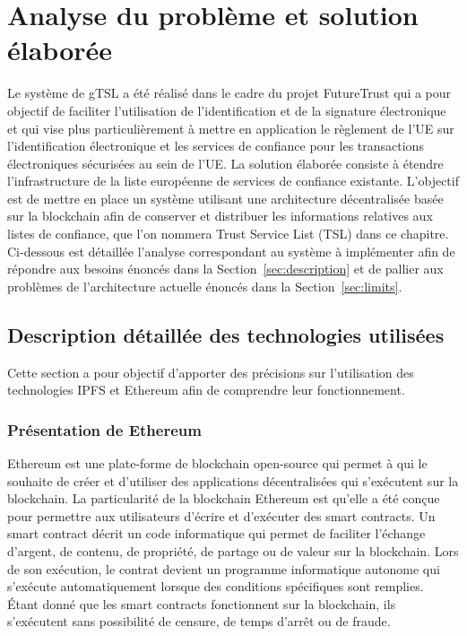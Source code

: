 \documentclass{tnreport}
\begin{document}
\chapter{Analyse du problème et solution élaborée}
\label{sec:analyse}

Le système de gTSL a été réalisé dans le cadre du projet FutureTrust qui a pour objectif de faciliter l'utilisation de l'identification et de la signature électronique et qui vise plus particulièrement à mettre en application le règlement de l'UE sur l'identification électronique et les services de confiance pour les transactions électroniques sécurisées au sein de l'UE.
La solution élaborée consiste à étendre l'infrastructure de la liste européenne de services de confiance existante. L'objectif est de mettre en place un système utilisant une architecture décentralisée basée sur la blockchain afin de conserver et distribuer les informations relatives aux listes de confiance, que l'on nommera Trust Service List (TSL) dans ce chapitre. Ci-dessous est détaillée l'analyse correspondant au système à implémenter afin de répondre aux besoins énoncés dans la Section~\ref{sec:description} et de pallier aux problèmes de l'architecture actuelle énoncés dans la Section~\ref{sec:limits}.

\section{Description détaillée des technologies utilisées}

Cette section a pour objectif d'apporter des précisions sur l'utilisation des technologies IPFS et Ethereum afin de comprendre leur fonctionnement.

\subsection{Présentation de Ethereum}

Ethereum est une plate-forme de blockchain open-source qui permet à qui le souhaite de créer et d'utiliser des applications décentralisées qui s'exécutent sur la blockchain. 
La particularité de la blockchain Ethereum est qu'elle a été conçue pour permettre aux utilisateurs d'écrire et d'exécuter des smart contracts. Un smart contract décrit un code informatique qui permet de faciliter l'échange d'argent, de contenu, de propriété, de partage ou de valeur sur la blockchain.
Lors de son exécution, le contrat devient un programme informatique autonome qui s'exécute automatiquement lorsque des conditions spécifiques sont remplies. Étant donné que les smart contracts fonctionnent sur la blockchain, ils s'exécutent sans possibilité de censure, de temps d'arrêt ou de fraude. 
\end{document}
